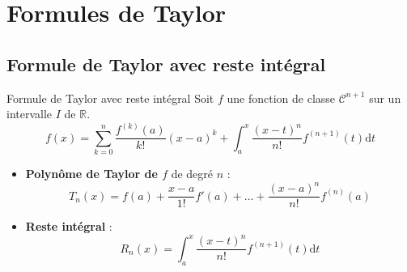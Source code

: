 














\section{Formules de Taylor} %
\label{sec:Formules de Taylor}

\subsection{Formule de Taylor avec reste intégral} %
\label{sub:Formule de Taylor avec reste intégral}

\begin{Theorem}{Formule de Taylor avec reste intégral}{}
Soit $f$ une fonction de classe $\mathscr{C} ^{n+1}$ sur un intervalle $I$ de $\mathbb{R}$. 
\begin{equation}
  f(x) = \sum_{k=0}^{n} \frac{f ^{(k)}(a)}{k!} (x-a) ^{k} + \int_{a}^{x} \frac{(x-t) ^{n}
  }{n!}  f ^{(n+1)}(t) \mathrm{d}t
\end{equation}

\begin{itemize}

    \item \textbf{Polynôme de Taylor de $f$} de degré $n$ : 
      \begin{equation}
        T_n(x) = f(a) + \frac{x-a}{1!} f'(a) + \dots + \frac{(x-a) ^{n}}{n!} f ^{(n)}(a)
      \end{equation}

    \item \textbf{Reste intégral} : 
      \begin{equation}
        R_n(x) = \int_{
          a
        }^{x} \frac{(x-t) ^{n}}{n!} f ^{(n+1)} (t) \mathrm{d} t
      \end{equation}
\end{itemize}
\end{Theorem}

